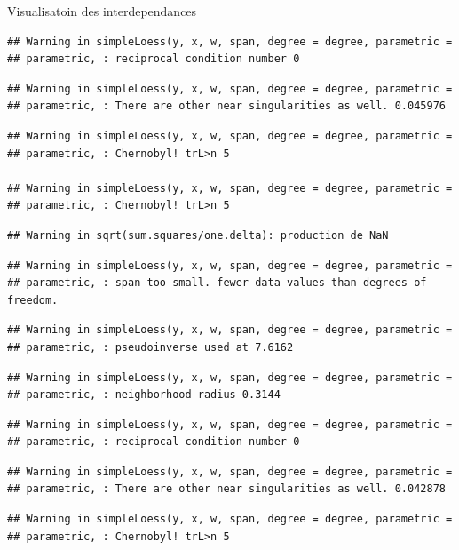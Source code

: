 \documentclass[11pt,ignorenonframetext,]{beamer}
\begin{document}
\begin{frame}[fragile]{Visualisatoin des interdependances}
\begin{verbatim}
## Warning in simpleLoess(y, x, w, span, degree = degree, parametric =
## parametric, : reciprocal condition number 0
\end{verbatim}

\begin{verbatim}
## Warning in simpleLoess(y, x, w, span, degree = degree, parametric =
## parametric, : There are other near singularities as well. 0.045976
\end{verbatim}

\begin{verbatim}
## Warning in simpleLoess(y, x, w, span, degree = degree, parametric =
## parametric, : Chernobyl! trL>n 5

## Warning in simpleLoess(y, x, w, span, degree = degree, parametric =
## parametric, : Chernobyl! trL>n 5
\end{verbatim}

\begin{verbatim}
## Warning in sqrt(sum.squares/one.delta): production de NaN
\end{verbatim}

\begin{verbatim}
## Warning in simpleLoess(y, x, w, span, degree = degree, parametric =
## parametric, : span too small. fewer data values than degrees of freedom.
\end{verbatim}

\begin{verbatim}
## Warning in simpleLoess(y, x, w, span, degree = degree, parametric =
## parametric, : pseudoinverse used at 7.6162
\end{verbatim}

\begin{verbatim}
## Warning in simpleLoess(y, x, w, span, degree = degree, parametric =
## parametric, : neighborhood radius 0.3144
\end{verbatim}

\begin{verbatim}
## Warning in simpleLoess(y, x, w, span, degree = degree, parametric =
## parametric, : reciprocal condition number 0
\end{verbatim}

\begin{verbatim}
## Warning in simpleLoess(y, x, w, span, degree = degree, parametric =
## parametric, : There are other near singularities as well. 0.042878
\end{verbatim}

\begin{verbatim}
## Warning in simpleLoess(y, x, w, span, degree = degree, parametric =
## parametric, : Chernobyl! trL>n 5


\end{verbatim}
\end{frame}
\end{document}
